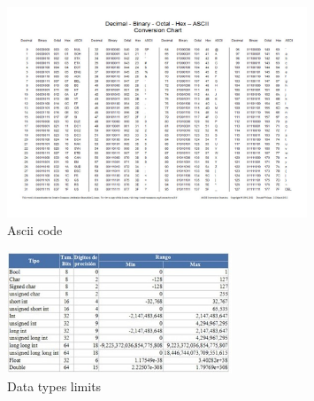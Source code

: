 \begin{figure}[H]
    \centering
    \includegraphics[width=0.8\textwidth]{code/pictures/Ascii.jpg}
    \caption{Ascii code}
    \label{Ascii}
\end{figure}
\begin{figure}[H]
    \centering
    \includegraphics[width=0.6\textwidth]{code/pictures/DataTypes.jpg}
    \caption{Data types limits}
    \label{DataTypes}
\end{figure}
